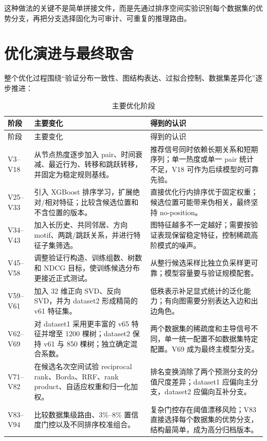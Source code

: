 \documentclass[UTF8,a4paper,11pt]{ctexart}
\begin{document}
这种做法的关键不是简单拼接文件，而是先通过排序空间实验识别每个数据集的优势分支，再把分支选择固化为可审计、可重复的推理路由。

\section{优化演进与最终取舍}

整个优化过程围绕“验证分布一致性、图结构表达、过拟合控制、数据集差异化”逐步推进：

\begin{longtable}{C{1.9cm}p{4.2cm}p{8.1cm}}
\caption{主要优化阶段}\label{tab:evolution}\\
\toprule
阶段 & 主要变化 & 得到的认识 \\
\midrule
\endfirsthead
\toprule
阶段 & 主要变化 & 得到的认识 \\
\midrule
\endhead
V3--V18 & 从节点热度逐步加入 pair、时间衰减、最近行为、转移和跳跃转移，并固定为稳定规则基线。 & 推荐信号同时依赖长期关系和短期序列；单一热度或单一 pair 统计不足，V18 可作为后续模型的可靠先验。 \\
V25--V33 & 引入 XGBoost 排序学习，扩展绝对/相对特征；比较含候选位置和不含位置的版本。 & 直接优化行内排序优于固定权重；候选位置可能带来伪相关，最终坚持 no-position。 \\
V34--V43 & 加入长历史、共同邻居、方向 motif、两跳/跳跃关系，并进行特征子集筛选。 & 图特征越多不一定越好；需要按验证表现保留稳定特征，控制稀疏高阶模式的噪声。 \\
V45--V58 & 调整验证行构造、训练组数、树数和 NDCG 目标，使训练候选分布更接近正式测试。 & 从整行候选采样比独立负采样更可靠；模型容量要与验证规模配套。 \\
V59--V61 & 加入 32 维正向 SVD、反向 SVD，并为 dataset2 形成精简的 v61 特征集。 & 低秩表示补足显式统计的泛化能力；有向图需要分别表达入边和出边角色。 \\
V62--V69 & 对 dataset1 采用更丰富的 v65 特征并增至 1200 棵树；dataset2 保持 v61 与 850 棵树；独立确定混合系数。 & 两个数据集的稀疏度和主导信号不同，单一统一配置不如数据集特定配置。V69 成为最终主模型分支。 \\
V71--V82 & 在候选名次空间试验 reciprocal rank、Borda、RRF、rank product、自适应权重和归一化加权。 & 排名变换消除了两个预测分支的分值尺度差异；dataset1 应偏向主分支，dataset2 应偏向互补分支。 \\
V83--V94 & 比较数据集级路由、3\%--8\% 置信度门控以及不同排序校准组合。 & 复杂门控存在阈值漂移风险；V83 直接选择每个数据集的优势分支，结构最简单，成为高分归档版本。 \\
\bottomrule
\end{longtable}
\end{document}
